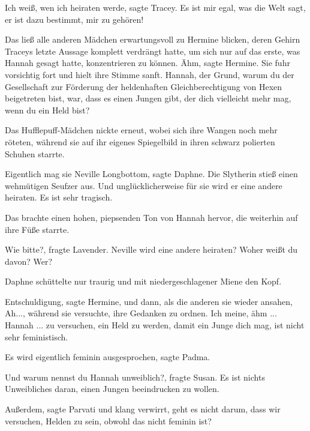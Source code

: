 \glqq{}Ich weiß, wen ich heiraten werde\grqq{}, sagte Tracey. \glqq{}Es ist mir
egal, was die Welt sagt, er ist dazu bestimmt, mir zu gehören!\grqq{}

Das ließ alle anderen Mädchen erwartungsvoll zu Hermine blicken, deren Gehirn
Traceys letzte Aussage komplett verdrängt hatte, um sich nur auf das erste, was
Hannah gesagt hatte, konzentrieren zu können. \glqq{}Ähm\grqq{}, sagte Hermine.
Sie fuhr vorsichtig fort und hielt ihre Stimme sanft. \glqq{}Hannah, der Grund,
warum du der Gesellschaft zur Förderung der heldenhaften Gleichberechtigung von
Hexen beigetreten bist, war, dass es einen Jungen gibt, der dich vielleicht mehr
mag, wenn du ein Held bist?\grqq{}

Das Hufflepuff-Mädchen nickte erneut, wobei sich ihre Wangen noch mehr röteten,
während sie auf ihr eigenes Spiegelbild in ihren schwarz polierten Schuhen
starrte.

\glqq{}Eigentlich mag sie Neville Longbottom\grqq{}, sagte Daphne. Die Slytherin
stieß einen wehmütigen Seufzer aus. \glqq{}Und unglücklicherweise für sie wird er
eine andere heiraten. Es ist sehr tragisch.\grqq{}

Das brachte einen hohen, piepsenden Ton von Hannah hervor, die weiterhin auf
ihre Füße starrte.

\glqq{}Wie bitte?\grqq{}, fragte Lavender. \glqq{}Neville wird eine andere
heiraten? Woher weißt du davon? Wer?\grqq{}

Daphne schüttelte nur traurig und mit niedergeschlagener Miene den Kopf.

\glqq{}Entschuldigung\grqq{}, sagte Hermine, und dann, als die anderen sie wieder
ansahen, \glqq{}Ah...\grqq{}, während sie versuchte, ihre Gedanken zu ordnen.
\glqq{}Ich meine, ähm ... Hannah ... zu versuchen, ein Held zu werden, damit ein
Junge dich mag, ist nicht sehr feministisch.\grqq{}

\glqq{}Es wird eigentlich feminin ausgesprochen\grqq{}, sagte Padma.

\glqq{}Und warum nennst du Hannah unweiblich?\grqq{}, fragte Susan. \glqq{}Es ist
nichts Unweibliches daran, einen Jungen beeindrucken zu wollen.\grqq{}

\glqq{}Außerdem\grqq{}, sagte Parvati und klang verwirrt, \glqq{}geht es nicht
darum, dass wir versuchen, Helden zu sein, obwohl das nicht feminin ist?\grqq{}

